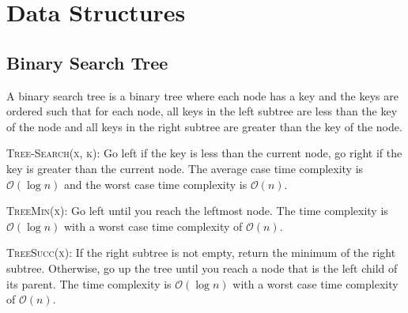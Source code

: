 \section{Data Structures}
\subsection{Binary Search Tree}
A binary search tree is a binary tree where each node has a key and the keys are ordered such that for each node, all keys in the left subtree are less than the key of the node and all keys in the right subtree are greater than the key of the node. 

\begin{algorithm}
    \caption{\textsc{Tree-Search(x, k)}: Go left if the key is less than the current node, go right if the key is greater than the current node. The average case time complexity is \( \mathcal{O}(\log n) \) and the worst case time complexity is \( \mathcal{O}(n) \).}
    \begin{algorithmic}
            \State{}
        \EndIf{}
            \State{}
        \Else{}
            \State{}
        \EndIf{}
    \end{algorithmic}
\end{algorithm}
    
\begin{algorithm}
    \caption{\textsc{TreeMin(x)}: Go left until you reach the leftmost node. The time complexity is \( \mathcal{O}(\log n) \) with a worst case time complexity of \( \mathcal{O}(n) \).}
    \begin{algorithmic}
            \State{}
        \EndIf{}
        \State{}
    \end{algorithmic}
\end{algorithm}

\begin{algorithm}
    \caption{\textsc{TreeSucc(x)}: If the right subtree is not empty, return the minimum of the right subtree. Otherwise, go up the tree until you reach a node that is the left child of its parent. The time complexity is \( \mathcal{O}(\log n) \) with a worst case time complexity of \( \mathcal{O}(n) \).}
    \begin{algorithmic}
            \State{}
        \EndIf{}
        \EndWhile{}
        \State{}
    \end{algorithmic}
\end{algorithm}

